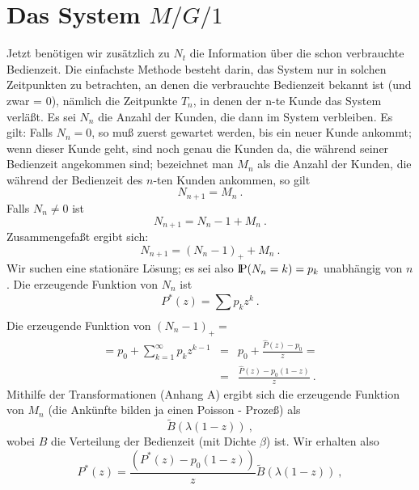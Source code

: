 \section{Das System $M/G/1$}
Jetzt benötigen wir zusätzlich zu $N_{t}$ die Information über die
schon verbrauchte Bedienzeit. Die einfachste Methode besteht darin, das
System nur in solchen Zeitpunkten zu betrachten, an denen die verbrauchte
Bedienzeit bekannt ist (und zwar = 0), nämlich die Zeitpunkte $T_{n}$, in
denen der n-te Kunde das System verläßt. Es sei $N_{n}$ die Anzahl der
Kunden, die dann im System verbleiben. Es gilt: Falls $N_{n}=0$, so muß
zuerst gewartet werden, bis ein neuer Kunde ankommt; wenn dieser Kunde
geht, sind noch genau die Kunden da, die während seiner Bedienzeit
angekommen sind; bezeichnet man $M_{n}$ als die Anzahl der Kunden, die
während der Bedienzeit des $n$-ten Kunden ankommen, so gilt
\begin{displaymath}
N_{n+1} = M_{n} ~.
\end{displaymath}
Falls $N_{n} \not= 0$ ist
\begin{displaymath}
N_{n+1} = N_{n} - 1 + M_{n} ~.
\end{displaymath}
Zusammengefaßt ergibt sich:
\begin{displaymath}
N_{n+1} = (N_{n} - 1)_{+} + M_{n} ~.
\end{displaymath}
Wir suchen eine stationäre Lösung; es sei also ${\rm I\kern-0.2em P} (N_{n}=k)=p_{k}$
unabhängig von $n$. Die erzeugende Funktion von $N_{n}$ ist
\begin{displaymath}
P^{*}(z) = \sum_{}^{}p_{k}z^{k} ~.
\end{displaymath}
Die erzeugende Funktion von $(N_{n}-1)_{+}=$
\begin{eqnarray*}
= p_{0} + \sum_{k=1}^{\infty} p_{k} z^{k-1} &=& p_{0}+ \frac{\hat P
(z) - p_{0}}{z} = \\
 &=& \frac{\hat P(z) - p_{0}(1-z)}{z} ~.
\end{eqnarray*}
Mithilfe der Transformationen (Anhang A) ergibt sich die erzeugende Funktion von $M_{n}$
(die Ankünfte bilden ja einen Poisson - Prozeß) als
\begin{displaymath}
\tilde B (\lambda(1 - z)) ~,
\end{displaymath}
wobei $B$ die Verteilung der Bedienzeit (mit Dichte $\beta$) ist. Wir
erhalten also
\begin{displaymath}
P^{*}(z) = \frac{(P^{*}(z) - p_{0}(1-z))}{z}  \tilde B (\lambda(1-z)) ~,
\end{displaymath}
